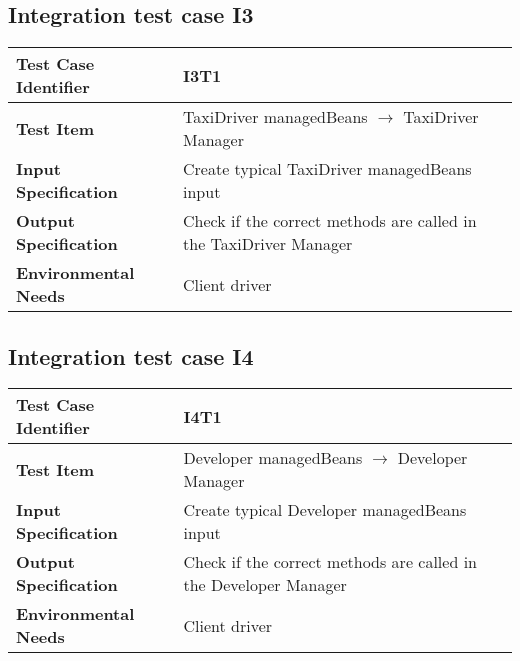 \subsection{Integration test case I3}

\begin{table}[!htbp]
\begin{center}
\begin{tabular}[t]{p{}|p{}}

\hline
\textbf{Test Case Identifier} & I3T1 \\
\hline
\textbf{Test Item} & TaxiDriver managedBeans $\rightarrow$ TaxiDriver Manager \\
\hline
\textbf{Input Specification} & Create typical TaxiDriver managedBeans input  \\
\hline
\textbf{Output Specification} & Check if the correct methods are called in the TaxiDriver Manager \\
\hline
\textbf{Environmental Needs} & Client driver \\
\hline

\end{tabular}
\end{center}
\end{table}

\subsection{Integration test case I4}

\begin{table}[!htbp]
\begin{center}
\begin{tabular}[t]{p{}|p{}}

\hline
\textbf{Test Case Identifier} & I4T1 \\
\hline
\textbf{Test Item} & Developer managedBeans $\rightarrow$ Developer Manager \\
\hline
\textbf{Input Specification} & Create typical Developer managedBeans input  \\
\hline
\textbf{Output Specification} & Check if the correct methods are called in the Developer Manager \\
\hline
\textbf{Environmental Needs} & Client driver \\
\hline

\end{tabular}
\end{center}
\end{table}
\clearpage


